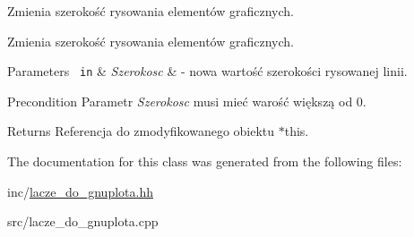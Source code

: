Zmienia szerokość rysowania elementów graficznych. 

Zmienia szerokość rysowania elementów graficznych.


\begin{DoxyParams}[1]{Parameters}
\mbox{\texttt{ in}}  & {\em Szerokosc} & -\/ nowa wartość szerokości rysowanej linii. \\
\hline
\end{DoxyParams}
\begin{DoxyPrecond}{Precondition}
Parametr {\itshape Szerokosc} musi mieć warość większą od 0. 
\end{DoxyPrecond}
\begin{DoxyReturn}{Returns}
Referencja do zmodyfikowanego obiektu {\ttfamily $\ast$this}. 
\end{DoxyReturn}


The documentation for this class was generated from the following files\+:\begin{DoxyCompactItemize}
\item 
inc/\mbox{\hyperlink{lacze__do__gnuplota_8hh}{lacze\+\_\+do\+\_\+gnuplota.\+hh}}\item 
src/lacze\+\_\+do\+\_\+gnuplota.\+cpp\end{DoxyCompactItemize}
